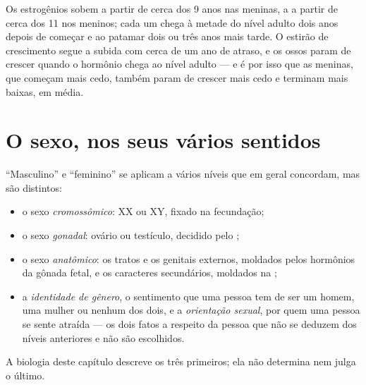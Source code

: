 \begin{example}\label{ex:g11:becoming-male-female:curves}
Os estrogênios sobem a partir de cerca dos 9 anos nas meninas, a
 a partir de cerca dos 11 nos meninos; cada um chega à
metade do nível adulto dois anos depois de começar e ao patamar dois ou
três anos mais tarde. O estirão de crescimento segue a subida com cerca
de um ano de atraso, e os ossos param de crescer quando o hormônio
chega ao nível adulto --- e é por isso que as meninas, que começam mais
cedo, também param de crescer mais cedo e terminam mais baixas, em
média.
\end{example}

\section{O sexo, nos seus vários sentidos}

\begin{proposition}\label{prop:g11:becoming-male-female:levels}
``Masculino'' e ``feminino'' se aplicam a vários níveis que em geral
concordam, mas são distintos:
\begin{itemize}
  \item o sexo \emph{cromossômico}: XX ou XY, fixado na fecundação;
  \item o sexo \emph{gonadal}: ovário ou testículo, decidido pelo ;
  \item o sexo \emph{anatômico}: os tratos e os genitais externos,
        moldados pelos hormônios da gônada fetal, e os caracteres
        secundários, moldados na ;
  \item a \emph{identidade de gênero}, o sentimento que uma pessoa tem
        de ser um homem, uma mulher ou nenhum dos dois, e a
        \emph{orientação sexual}, por quem uma pessoa se sente atraída
        --- os dois fatos a respeito da pessoa que não se deduzem dos
        níveis anteriores e não são escolhidos.
\end{itemize}
A biologia deste capítulo descreve os três primeiros; ela não determina
nem julga o último.
\end{proposition}
\admitted

